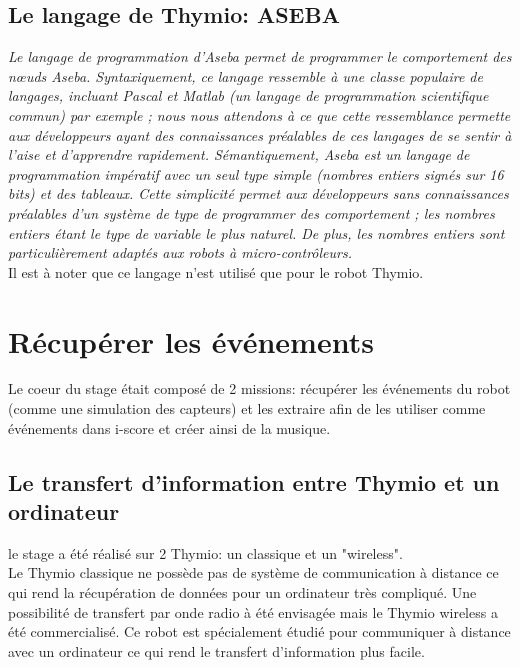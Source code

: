 \documentclass[a4paper, 12pt]{report}
\begin{document}
\section{Le langage de Thymio: ASEBA \cite{thymio2016}}
\textit{Le langage de programmation d'Aseba permet de programmer le comportement des nœuds Aseba. Syntaxiquement, ce langage ressemble à une classe populaire de langages, incluant Pascal et Matlab (un langage de programmation scientifique commun) par exemple ; nous nous attendons à ce que cette ressemblance permette aux développeurs ayant des connaissances préalables de ces langages de se sentir à l'aise et d'apprendre rapidement. Sémantiquement, Aseba est un langage de programmation impératif avec un seul type simple (nombres entiers signés sur 16 bits) et des tableaux. Cette simplicité permet aux développeurs sans connaissances préalables d'un système de type de programmer des comportement ; les nombres entiers étant le type de variable le plus naturel. De plus, les nombres entiers sont particulièrement adaptés aux robots à micro-contrôleurs.}\\
Il est à noter que ce langage n'est utilisé que pour le robot Thymio.


\chapter{Récupérer les événements}
Le coeur du stage était composé de 2 missions: récupérer les événements du robot (comme une simulation des capteurs) et les extraire afin de les utiliser comme événements dans i-score et créer ainsi de la musique.
\section{Le transfert d'information entre Thymio et un ordinateur}
le stage a été réalisé sur 2 Thymio: un classique et un "wireless".\\
Le Thymio classique ne possède pas de système de communication à distance ce qui rend la récupération de données pour un ordinateur très compliqué. Une possibilité de transfert par onde radio à été envisagée mais le Thymio wireless a été commercialisé. Ce robot est spécialement étudié pour communiquer à distance avec un ordinateur ce qui rend le transfert d'information plus facile.
\end{document}

